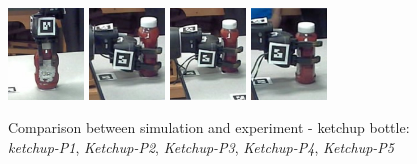 \begin{figure}[!!hbt]
\begin{center}
{ \includegraphics[width=0.18\textwidth]    {images/ssoch/fig/heinz_p2_1}    \label{heinz_p2_1}}
{ \includegraphics[width=0.18\textwidth]    {images/ssoch/fig/heinz_p3_1}    \label{heinz_p3_1}}
{ \includegraphics[width=0.18\textwidth]    {images/ssoch/fig/heinz_p4_1}    \label{heinz_p4_1}}
{ \includegraphics[width=0.18\textwidth]    {images/ssoch/fig/heinz_p5_1}    \label{heinz_p5_1}}
        \caption{Comparison between simulation and experiment - ketchup bottle: \emph{ketchup-P1}, \emph{Ketchup-P2}, \emph{Ketchup-P3}, \emph{Ketchup-P4}, \emph{Ketchup-P5}}
        \label{heinz_bottle}
        \end{center}
\end{figure}


